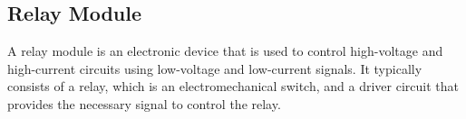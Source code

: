 \documentclass[conference]{IEEEtran}
\begin{document}
	\subsection{Relay Module}
	A relay module is an electronic device that is used to control high-voltage and high-current circuits using low-voltage and low-current signals. It typically consists of a relay, which is an electromechanical switch, and a driver circuit that provides the necessary signal to control the relay.
	
	
\end{document}

